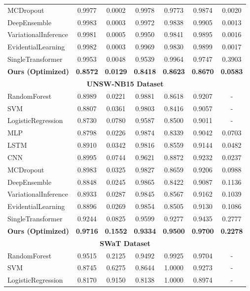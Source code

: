 \begin{table*}[htbp]
\begin{tabular}{l|ccccc|c}
MCDropout & 0.9977 & 0.0002 & 0.9978 & 0.9773 & 0.9874 & 0.0020 \\
DeepEnsemble & 0.9983 & 0.0003 & 0.9972 & 0.9838 & 0.9905 & 0.0013 \\
VariationalInference & 0.9981 & 0.0005 & 0.9950 & 0.9841 & 0.9895 & 0.0016 \\
EvidentialLearning & 0.9982 & 0.0003 & 0.9969 & 0.9830 & 0.9899 & 0.0017 \\
SingleTransformer & 0.9953 & 0.0048 & 0.9539 & 0.9964 & 0.9747 & 0.3903 \\
\textbf{Ours (Optimized)} & \textbf{0.8572} & \textbf{0.0129} & \textbf{0.8418} & \textbf{0.8623} & \textbf{0.8670} & \textbf{0.0583} \\
\hline
\multicolumn{7}{c}{\textbf{UNSW-NB15 Dataset}} \\
\hline
RandomForest & 0.8989 & 0.0221 & 0.9881 & 0.8618 & 0.9207 & - \\
SVM & 0.8807 & 0.0361 & 0.9803 & 0.8416 & 0.9057 & - \\
LogisticRegression & 0.8730 & 0.0780 & 0.9587 & 0.8500 & 0.9011 & - \\
MLP & 0.8798 & 0.0226 & 0.9874 & 0.8339 & 0.9042 & 0.0703 \\
LSTM & 0.8910 & 0.0342 & 0.9816 & 0.8559 & 0.9144 & 0.0482 \\
CNN & 0.8995 & 0.0744 & 0.9621 & 0.8872 & 0.9232 & 0.0237 \\
MCDropout & 0.8983 & 0.0325 & 0.9827 & 0.8659 & 0.9206 & 0.0988 \\
DeepEnsemble & 0.8848 & 0.0245 & 0.9865 & 0.8422 & 0.9087 & 0.1136 \\
VariationalInference & 0.8933 & 0.0287 & 0.9845 & 0.8567 & 0.9162 & 0.1039 \\
EvidentialLearning & 0.8896 & 0.0269 & 0.9854 & 0.8505 & 0.9130 & 0.1086 \\
SingleTransformer & 0.9244 & 0.0825 & 0.9599 & 0.9277 & 0.9435 & 0.2777 \\
\textbf{Ours (Optimized)} & \textbf{0.9716} & \textbf{0.1552} & \textbf{0.9334} & \textbf{0.9500} & \textbf{0.9700} & \textbf{0.2278} \\
\hline
\multicolumn{7}{c}{\textbf{SWaT Dataset}} \\
\hline
RandomForest & 0.9515 & 0.2125 & 0.9492 & 0.9925 & 0.9704 & - \\
SVM & 0.8745 & 0.6275 & 0.8644 & 1.0000 & 0.9273 & - \\
LogisticRegression & 0.8170 & 0.9150 & 0.8138 & 1.0000 & 0.8974 & - \\

\end{tabular}
\end{table*}
